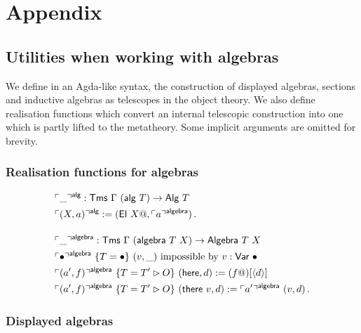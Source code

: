 \section{Appendix}

\allowdisplaybreaks

\subsection{Utilities when working with algebras} \label{app:algebras}

We define in an Agda-like syntax, the construction of displayed
algebras, sections and inductive algebras as telescopes in the object theory. We
also define realisation functions which convert an internal telescopic
construction into one which is partly lifted to the metatheory. Some implicit
arguments are omitted for brevity.

\subsubsection{Realisation functions for algebras}

\begin{fleqn}
\begin{align*}
&\emb{\_}^{\mta{alg}} : \Tms\ \Gamma\ (\mta{alg}\ T) \to \mta{Alg}\ T \\
&\emb{(X, a)}^{\mta{alg}} := (\mta{El}\ X@, \emb{a}^{\mta{algebra}}) \,. \\[1em]
&\emb{\_}^{\mta{algebra}} : \Tms\ \Gamma\ (\mta{algebra}\ T\ X) \to \mta{Algebra}\ T\ X \\
&\emb{\bullet}^{\mta{algebra}}\ \{T = \bullet\}\ (v, \_)\text{ impossible by $v : \mta{Var}\ \bullet$} \\
&\emb{(a', f)}^{\mta{algebra}}\ \{T = T' \rhd O\}\ (\mta{here}, d) := (f@)[\Msub{d}] \\
&\emb{(a', f)}^{\mta{algebra}}\ \{T = T' \rhd O\}\ (\mta{there}\ v, d) := \emb{a'}^{\mta{algebra}}\ (v, d) \,.
\end{align*}
\end{fleqn}

\subsubsection{Displayed algebras}

